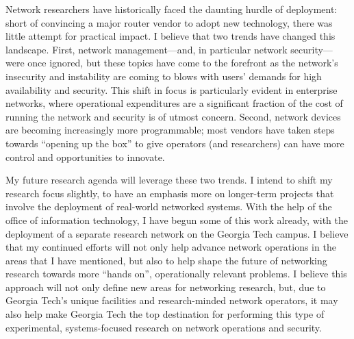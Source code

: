 Network researchers have historically faced the daunting hurdle of
deployment: short of convincing a major router vendor to adopt new
technology, there was little attempt for practical impact.  I believe
that two trends have changed this landscape.  First, network
management---and, in particular network security---were once ignored,
but these topics have come to the forefront as the network's insecurity
and instability are coming to blows with users' demands for high
availability and security.  This shift in focus is particularly evident
in enterprise networks, where operational expenditures are a significant
fraction of the cost of running the network and security is of utmost
concern.  Second, network devices are becoming increasingly more
programmable; most vendors have taken steps towards ``opening up the
box'' to give operators (and researchers) can have more control and
opportunities to innovate.

My future research agenda will leverage these two trends.  I intend to
shift my research focus slightly, to have an emphasis more on
longer-term projects that involve the deployment of real-world networked
systems.  With the help of the office of information technology, I have
begun some of this work already, with the deployment of a separate
research network on the Georgia Tech campus.  I believe that my
continued efforts will not only help advance network operations in the
areas that I have mentioned, but also to help shape the future of
networking research towards more ``hands on'', operationally relevant
problems.  I believe this approach will not only define new areas for
networking research, but, due to Georgia Tech's unique facilities and
research-minded network operators, it may also help make Georgia Tech
the top destination for performing this type of experimental,
systems-focused research on network operations and security.
